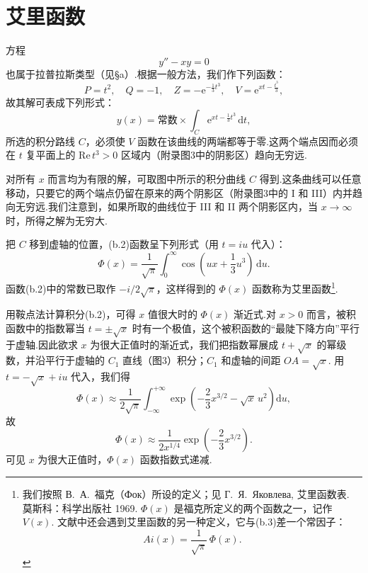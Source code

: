 \section{艾里函数}

方程
\begin{equation}
  y''-xy=0
\end{equation}
也属于拉普拉斯类型（见§a）.根据一般方法，我们作下列函数：
\begin{equation*}
  P=t^2,\quad Q=-1,\quad
  Z=-\mathrm{e}^{-\frac{1}{3}t^3},\quad
  V=\mathrm{e}^{xt-\frac{t^3}{3}},
\end{equation*}
故其解可表成下列形式：
\begin{equation}
  y(x)=\text{常数}\times\int_C\mathrm{e}^{xt-\frac{1}{3}t^3}\,\mathrm{d}t,
\end{equation}
所选的积分路线 $C$，必须使 $V$ 函数在该曲线的两端都等于零.这两个端点因而必须在 $t$ 复平面上的 $\mathrm{Re}\,t^3>0$ 区域内（附录图3中的阴影区）趋向无穷远.

对所有 $x$ 而言均为有限的解，可取图中所示的积分曲线 $C$ 得到.这条曲线可以任意移动，只要它的两个端点仍留在原来的两个阴影区（附录图3中的 I 和 III）内并趋向无穷远.我们注意到，如果所取的曲线位于 III 和 II 两个阴影区内，当 $x\to\infty$ 时，所得之解为无穷大.

把 $C$ 移到虚轴的位置，(b.2)函数呈下列形式（用 $t=iu$ 代入）：
\begin{equation}
  \varPhi(x)=\frac{1}{\sqrt{\pi}}\int_0^{\infty}
  \cos\left(ux+\frac{1}{3}u^3\right)\,\mathrm{d}u.
\end{equation}
函数(b.2)中的常数已取作 $-i/2\sqrt{\pi}$，这样得到的 $\varPhi(x)$ 函数称为艾里函数\footnote{我们按照 В.~А.~福克（Фок）所设的定义；见 Г.~Я.~Яковлева, 艾里函数表. 莫斯科：科学出版社 1969. $\varPhi(x)$ 是福克所定义的两个函数之一，记作 $V(x)$. 文献中还会遇到艾里函数的另一种定义，它与(b.3)差一个常因子：
\begin{equation*}
  Ai(x)=\frac{1}{\sqrt{\pi}}\,\varPhi(x).
\end{equation*}}.

用鞍点法计算积分(b.2)，可得 $x$ 值很大时的 $\varPhi(x)$ 渐近式.对 $x>0$ 而言，被积函数中的指数幂当 $t=\pm\sqrt{x}$ 时有一个极值，这个被积函数的“最陡下降方向”平行于虚轴.因此欲求 $x$ 为很大正值时的渐近式，我们把指数幂展成 $t+\sqrt{x}$ 的幂级数，并沿平行于虚轴的 $C_1$ 直线（图3）积分；$C_1$ 和虚轴的间距 $OA=\sqrt{x}$. 用 $t=-\sqrt{x}+iu$ 代入，我们得
\begin{equation*}
  \varPhi(x)\approx\frac{1}{2\sqrt{\pi}}\int_{-\infty}^{+\infty}
  \exp\left(-\frac{2}{3}x^{3/2}-\sqrt{x}\,u^2\right)\mathrm{d}u,
\end{equation*}
故
\begin{equation}
  \varPhi(x)\approx\frac{1}{2x^{1/4}}\exp\left(-\frac{2}{3}x^{3/2}\right).
\end{equation}
可见 $x$ 为很大正值时，$\varPhi(x)$ 函数指数式递减.

